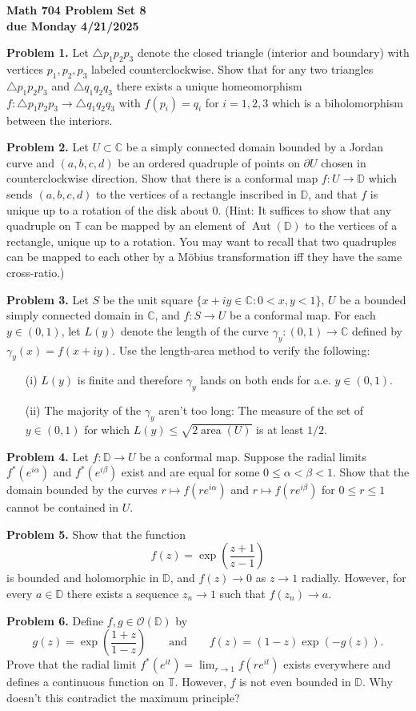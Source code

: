 \documentclass[12pt]{amsart}
\newcommand{\area}{\operatorname{area}}
\newcommand{\Aut}{\operatorname{Aut}}
\newcommand{\bd}{\partial}
\newcommand{\OO}{{\mathcal O}}
\newcommand{\CC}{{\mathbb C}}
\newcommand{\TT}{{\mathbb T}}
\newcommand{\DD}{{\mathbb D}}
\newcommand{\vs}{\vspace{2mm}}
\begin{document}
\begin{center}
{\bf \large Math 704 Problem Set 8} \vs \\
{\bf due Monday 4/21/2025} \vs \vs
\end{center}

\noindent
{\bf Problem 1.} Let $\triangle p_1p_2p_3$ denote the closed triangle (interior and boundary) with vertices $p_1,p_2,p_3$ labeled counterclockwise. Show that for any two triangles $\triangle p_1p_2p_3$ and $\triangle q_1q_2q_3$ there exists a unique homeomorphism $f: \triangle p_1p_2p_3 \to \triangle q_1q_2q_3$ with $f(p_i)=q_i$ for $i=1,2,3$ which is a biholomorphism between the interiors. \vs

\noindent
{\bf Problem 2.} Let $U \subset \CC$ be a simply connected domain bounded by a Jordan curve and $(a,b,c,d)$ be an ordered quadruple of points on $\bd U$ chosen in counterclockwise direction. Show that there is a conformal map $f: U \to \DD$ which sends $(a,b,c,d)$ to the vertices of a rectangle inscribed in $\DD$, and that $f$ is unique up to a rotation of the disk about $0$. (Hint: It suffices to show that any quadruple on $\TT$ can be mapped by an element of $\Aut(\DD)$ to the vertices of a rectangle, unique up to a rotation. You may want to recall that two quadruples can be mapped to each other by a M\"{o}bius transformation iff they have the same cross-ratio.) \vs 

\noindent
{\bf Problem 3.} Let $S$ be the unit square $\{ x+iy \in \CC : 0< x,y <1 \}$, $U$ be a bounded simply connected domain in $\CC$, and $f: S \to U$ be a conformal map. For each $y \in (0,1)$, let $L(y)$ denote the length of the curve $\gamma_y:(0,1) \to \CC$ defined by $\gamma_y(x)=f(x+iy)$. Use the length-area method to verify the following: \vs
\begin{enumerate}
\item[(i)]
$L(y)$ is finite and therefore $\gamma_y$ lands on both ends for a.e. $y \in (0,1)$. \vs
\item[(ii)]
The majority of the $\gamma_y$ aren't too long: The measure of the set of $y \in (0,1)$ for which $L(y) \leq \sqrt{2 \area(U)}$ is at least $1/2$. \vs
\end{enumerate}

\noindent
{\bf Problem 4.} Let $f: \DD \to U$ be a conformal map. Suppose the radial limits $f^*(e^{i\alpha})$ and $f^*(e^{i\beta})$ exist and are equal for some $0 \leq \alpha < \beta <1$. Show that the domain bounded by the curves $r \mapsto f(re^{i\alpha})$ and $r \mapsto f(re^{i\beta})$ for $0 \leq r \leq 1$ cannot be contained in $U$. \vs

\noindent
{\bf Problem 5.} Show that the function
$$
f(z) = \exp \left( \frac{z+1}{z-1} \right)
$$
is bounded and holomorphic in $\DD$, and $f(z) \to 0$ as $z \to 1$ radially. However, for every $a \in \DD$ there exists a sequence $z_n \to 1$ such that $f(z_n) \to a$. \vs 

\noindent
{\bf Problem 6.} Define $f,g \in \OO(\DD)$ by
$$
g(z) = \exp \left( \frac{1+z}{1-z} \right) \qquad \text{and} \qquad f(z)=(1-z)
\exp (-g(z)).
$$
Prove that the radial limit $f^{\ast}(e^{it})=\lim_{r \to 1} f(re^{it})$ exists everywhere and defines a continuous function on $\TT$. However, $f$ is not even bounded in $\DD$. Why doesn't this contradict the maximum principle? 
\end{document}

